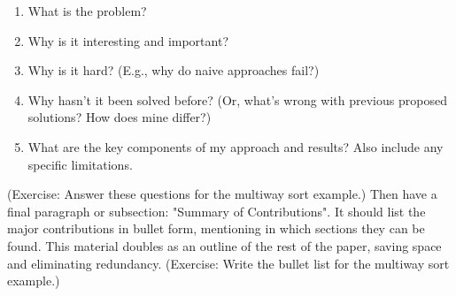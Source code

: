 \begin{enumerate}
\item What is the problem?
\item Why is it interesting and important?
\item Why is it hard? (E.g., why do naive approaches fail?)
\item Why hasn't it been solved before? (Or, what's wrong with previous proposed solutions? How does mine differ?)
\item What are the key components of my approach and results? Also include any specific limitations.
\end{enumerate}

(Exercise: Answer these questions for the multiway sort example.)
Then have a final paragraph or subsection: "Summary of Contributions". It should list the major contributions in bullet form, mentioning in which sections they can be found. This material doubles as an outline of the rest of the paper, saving space and eliminating redundancy.
(Exercise: Write the bullet list for the multiway sort example.)
